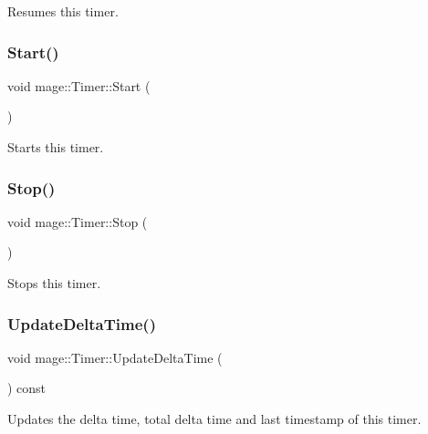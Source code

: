 Resumes this timer. \hypertarget{classmage_1_1_timer_a5855c9df8ad1a2b6774942e566833647}{}\label{classmage_1_1_timer_a5855c9df8ad1a2b6774942e566833647} 
\subsubsection{\texorpdfstring{Start()}{Start()}}
{\footnotesize\ttfamily void mage\+::\+Timer\+::\+Start (\begin{DoxyParamCaption}{ }\end{DoxyParamCaption})}

Starts this timer. \hypertarget{classmage_1_1_timer_abf234f1e2ee9e760f316bd49500d5a3a}{}\label{classmage_1_1_timer_abf234f1e2ee9e760f316bd49500d5a3a} 
\subsubsection{\texorpdfstring{Stop()}{Stop()}}
{\footnotesize\ttfamily void mage\+::\+Timer\+::\+Stop (\begin{DoxyParamCaption}{ }\end{DoxyParamCaption})}

Stops this timer. \hypertarget{classmage_1_1_timer_abb7112fc15fa0847c90437dc8fee5615}{}\label{classmage_1_1_timer_abb7112fc15fa0847c90437dc8fee5615} 
\subsubsection{\texorpdfstring{Update\+Delta\+Time()}{UpdateDeltaTime()}}
{\footnotesize\ttfamily void mage\+::\+Timer\+::\+Update\+Delta\+Time (\begin{DoxyParamCaption}{ }\end{DoxyParamCaption}) const\hspace{0.3cm}{\ttfamily [private]}}

Updates the delta time, total delta time and last timestamp of this timer. \hypertarget{classmage_1_1_timer_af1306c089d5e71fa5b3093d71ab55c45}{}\label{classmage_1_1_timer_af1306c089d5e71fa5b3093d71ab55c45} 
